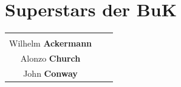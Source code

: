 \documentclass[a4paper,parskip=half*,DIV=7,fontsize=11pt]{scrartcl}
\begin{document}
\section{Superstars der BuK}
\begin{adjustbox}{center}
\begin{tabular}{ccc}
\parbox[t]{5cm}{\begin{center}
	\includegraphics[height=3cm]{img/ackermann.jpg}\\
	Wilhelm \textbf{Ackermann}
\end{center}
} &
\parbox[t]{5cm}{
	\begin{center}
	\includegraphics[height=3cm]{img/church.jpg}\\
		Alonzo \textbf{Church}
	\end{center}
} &
\parbox[t]{5cm}{
	\begin{center}
	\includegraphics[height=3cm]{img/conway.jpg}\\
		John \textbf{Conway}
	\end{center}
} \\


\end{tabular}
\end{adjustbox}
\end{document}
